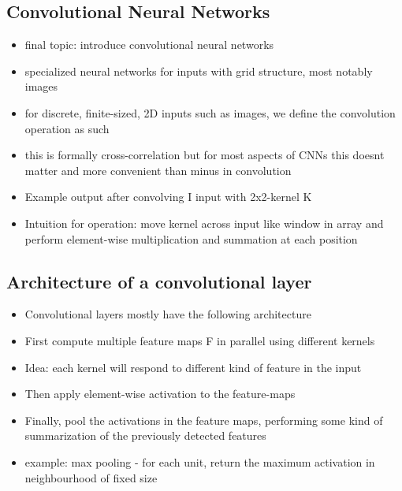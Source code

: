 \documentclass{article}
\begin{document}
\subsection*{Convolutional Neural Networks}
\begin{itemize}
    \item final topic: introduce convolutional neural networks
    \item specialized neural networks for inputs with grid structure, most notably images 
    \item for discrete, finite-sized, 2D inputs such as images, we define the convolution operation as such
    \item this is formally cross-correlation but for most aspects of CNNs this doesnt matter and more convenient than minus in convolution
    \item Example output after convolving I input with 2x2-kernel K
    \item Intuition for operation: move kernel across input like window in array and perform element-wise multiplication and summation at each position
\end{itemize}

\subsection*{Architecture of a convolutional layer}
\begin{itemize}
    \item Convolutional layers mostly have the following architecture
    \item First compute multiple feature maps F in parallel using different kernels
    \item Idea: each kernel will respond to different kind of feature in the input
    \item Then apply element-wise activation to the feature-maps
    \item Finally, pool the activations in the feature maps, performing some kind of summarization of the previously detected features
    \item example: max pooling - for each unit, return the maximum activation in neighbourhood of fixed size
\end{itemize}
\end{document}
